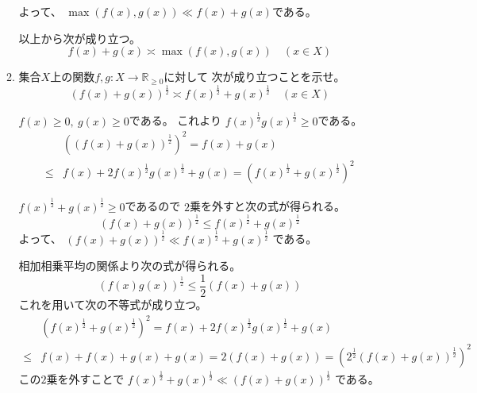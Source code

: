 \documentclass[12pt,b5paper]{ltjsarticle}
\begin{document}
\begin{enumerate}
\begin{enumerate}
            よって、
            $\max(f(x),g(x)) \ll f(x)+g(x)$である。

            以上から次が成り立つ。
            \begin{equation}
             f(x)+g(x) \asymp \max(f(x),g(x)) \quad (x\in X)
            \end{equation}


            \hrulefill

       \item
            集合$X$上の関数$f,g:X\to\mathbb{R}_{\geq 0}$に対して
            次が成り立つことを示せ。
            \begin{equation}
             (f(x)+g(x))^{\frac{1}{2}}
              \asymp
              f(x)^{\frac{1}{2}}+g(x)^{\frac{1}{2}} \quad (x\in X)
            \end{equation}

            \dotfill

            $f(x)\geq 0,\ g(x)\geq 0$である。
            これより
            $f(x)^{\frac{1}{2}}g(x)^{\frac{1}{2}} \geq 0$である。
            \begin{align}
             & \left( (f(x)+g(x))^{\frac{1}{2}} \right)^2
              = f(x)+g(x)\\
              \leq &
              f(x) + 2 f(x)^{\frac{1}{2}}g(x)^{\frac{1}{2}} + g(x)
              = \left( f(x)^{\frac{1}{2}}+g(x)^{\frac{1}{2}} \right)^{2}
            \end{align}

            $f(x)^{\frac{1}{2}}+g(x)^{\frac{1}{2}} \geq 0$であるので
            $2$乗を外すと次の式が得られる。
            \begin{equation}
             (f(x)+g(x))^{\frac{1}{2}}
              \leq
              f(x)^{\frac{1}{2}}+g(x)^{\frac{1}{2}}
            \end{equation}
            よって、
            $(f(x)+g(x))^{\frac{1}{2}} \ll f(x)^{\frac{1}{2}}+g(x)^{\frac{1}{2}}$
            である。


            相加相乗平均の関係より次の式が得られる。
            \begin{equation}
             ( f(x)g(x) )^{\frac{1}{2}}
              \leq \frac{1}{2} (f(x)+g(x))
            \end{equation}
            これを用いて次の不等式が成り立つ。
            \begin{align}
             & \left( f(x)^{\frac{1}{2}}+g(x)^{\frac{1}{2}} \right)^{2}
              =
              f(x) + 2 f(x)^{\frac{1}{2}}g(x)^{\frac{1}{2}} + g(x)\\
              \leq &
              f(x) + f(x)+g(x) + g(x)
              = 2(f(x)+g(x))
             = \left( 2^{\frac{1}{2}}(f(x)+g(x))^{\frac{1}{2}} \right)^{2}
            \end{align}
            この$2$乗を外すことで
            $f(x)^{\frac{1}{2}}+g(x)^{\frac{1}{2}} \ll (f(x)+g(x))^{\frac{1}{2}}$
            である。


\end{enumerate}
\end{enumerate}
\end{document}
